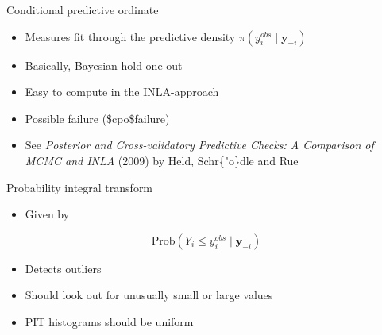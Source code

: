 \documentclass[
  ignorenonframetext,
]{beamer}
\newenvironment{Shaded}{\begin{snugshade}}{\end{snugshade}}
\newcommand{\AttributeTok}[1]{\textcolor[rgb]{0.77,0.63,0.00}{#1}}
\newcommand{\CommentTok}[1]{\textcolor[rgb]{0.56,0.35,0.01}{\textit{#1}}}
\newcommand{\ConstantTok}[1]{\textcolor[rgb]{0.00,0.00,0.00}{#1}}
\newcommand{\FunctionTok}[1]{\textcolor[rgb]{0.00,0.00,0.00}{#1}}
\newcommand{\NormalTok}[1]{#1}
\newcommand{\OtherTok}[1]{\textcolor[rgb]{0.56,0.35,0.01}{#1}}
\newcommand{\SpecialCharTok}[1]{\textcolor[rgb]{0.00,0.00,0.00}{#1}}
\providecommand{\tightlist}{%
  \setlength{\itemsep}{0pt}\setlength{\parskip}{0pt}}
\begin{document}
\begin{frame}[fragile]{Conditional predictive ordinate}
\protect\hypertarget{conditional-predictive-ordinate}{}
\small

\begin{Shaded}
\end{Shaded}

\normalsize

\begin{itemize}
\item
  Measures fit through the predictive density
  \(\pi(y_i^{obs}\mid\boldsymbol{y}_{-i})\)
\item
  Basically, Bayesian hold-one out
\item
  Easy to compute in the INLA-approach
\item
  Possible failure (\$cpo\$failure)
\item
  See \emph{Posterior and Cross-validatory Predictive Checks: A
  Comparison of MCMC and INLA} (2009) by Held, Schr\{"o\}dle and Rue
\end{itemize}
\end{frame}

\begin{frame}[fragile]{Probability integral transform}
\protect\hypertarget{probability-integral-transform}{}
\small

\begin{Shaded}
\end{Shaded}

\normalsize

\begin{itemize}
\tightlist
\item
  Given by
\end{itemize}

\[
\text{Prob}(Y_i \leq y_i^{obs} \mid \boldsymbol{y}_{-i})
\]

\begin{itemize}
\item
  Detects outliers
\item
  Should look out for unusually small or large values
\item
  PIT histograms should be uniform
\end{itemize}
\end{frame}
\end{document}
